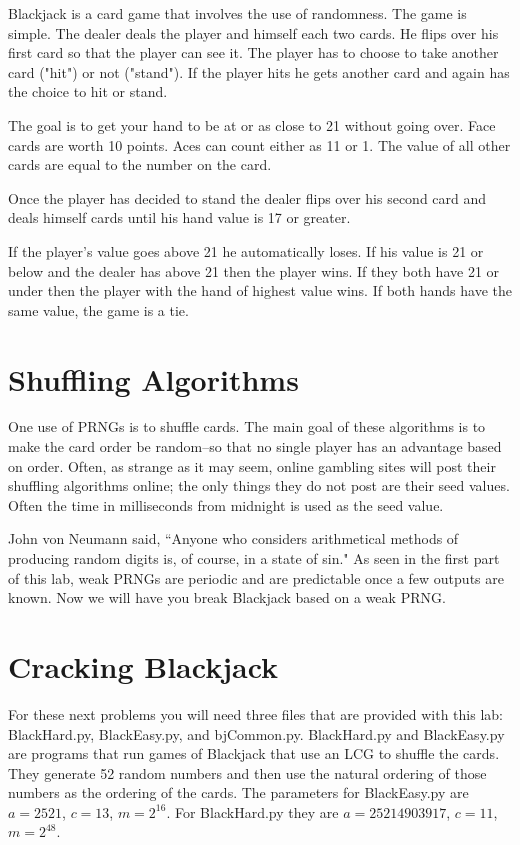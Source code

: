 Blackjack is a card game that involves the use of randomness.
The game is simple.
The dealer deals the player and himself each two cards.
He flips over his first card so that the player can see it.
The player has to choose to take another card ("hit") or not ("stand").
If the player hits he gets another card and again has the choice to hit or stand.

The goal is to get your hand to be at or as close to 21 without going over.
Face cards are worth 10 points.
Aces can count either as 11 or 1.
The value of all other cards are equal to the number on the card.

Once the player has decided to stand the dealer flips over his second card and deals himself cards until his hand value is 17 or greater. 

If the player's value goes above 21 he automatically loses.
If his value is 21 or below and the dealer has above 21 then the player wins.
If they both have 21 or under then the player with the hand of highest value wins.
If both hands have the same value, the game is a tie.

\section*{Shuffling Algorithms}
One use of PRNGs is to shuffle cards.
The main goal of these algorithms is to make the card order be random--so that no single player has an advantage based on order.
Often, as strange as it may seem, online gambling sites will post their shuffling algorithms online; the only things they do not post are their seed values.
Often the time in milliseconds from midnight is used as the seed value.

John von Neumann said, ``Anyone who considers arithmetical methods of producing random digits is, of course, in a state of sin."
As seen in the first part of this lab, weak PRNGs are periodic and are predictable once a few outputs are known.
Now we will have you break Blackjack based on a weak PRNG.

\section*{Cracking Blackjack}
For these next problems you will need three files that are provided with this lab: BlackHard.py, BlackEasy.py, and bjCommon.py.
BlackHard.py and BlackEasy.py are programs that run games of Blackjack that use an LCG to shuffle the cards.
They generate 52 random numbers and then use the natural ordering of those numbers as the ordering of the cards.
The parameters for BlackEasy.py are $a=2521$, $c=13$, $m=2^{16}$.
For BlackHard.py they are $a=25214903917$, $c=11$, $m=2^{48}$.

